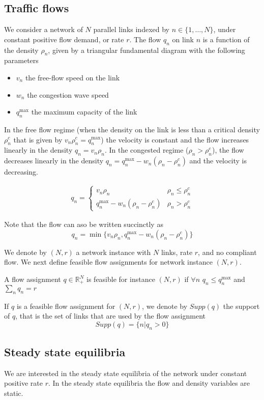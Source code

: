 \subsection{Traffic flows}
We consider a network of $N$ parallel links indexed by $n \in \{1, \dots, N \}$, under constant positive flow demand, or rate $r$. The flow $q_n$ on link $n$ is a function of the density $\rho_n$, given by a triangular fundamental diagram with the following parameters
\begin{itemize}
\item $v_n$ the free-flow speed on the link
\item $w_n$ the congestion wave speed
\item $q_n^{\max}$ the maximum capacity of the link
\end{itemize}
In the free flow regime (when the density on the link is less than a critical density $\rho_n^c$ that is given by $v_n\rho_n^c = q_n^{\max}$) the velocity is constant and the flow increases linearly in the density $q_n = v_n \rho_n$. In the congested regime ($\rho_n > \rho_n^c$), the flow decreases linearly in the density $q_n = q_n^{\max} - w_n(\rho_n - \rho_n^c)$ and the velocity is decreasing.

\begin{align*}
q_n = 
\begin{cases}
v_n \rho_n & \rho_n \leq \rho_n^c\\
q_n^{\max} - w_n(\rho_n - \rho_n^c) & \rho_n > \rho_n^c
\end{cases}
\end{align*}

Note that the flow can aso be written succinctly as
\[
q_n = \min \{ v_n \rho_n, q_n^{\max} - w_n(\rho_n - \rho_n^c)\}
\]

We denote by $(N, r)$ a network instance with $N$ links, rate $r$, and no compliant flow. We next define feasible flow assignments for network instance $(N, r)$.

\begin{definition}
A flow assignment $q \in \mathbb{R}_+^N$ is feasible for instance $(N, r)$ if $\forall n$ $q_n \leq q_n^{\max}$ and $\sum_n q_n = r$
\end{definition}

If $q$ is a feasible flow assignment for $(N, r)$, we denote by $Supp(q)$ the support of $q$, that is the set of links that are used by the flow assignment
\[
Supp(q) = \{ n | q_n >0 \}
\]

\subsection{Steady state equilibria}
We are interested in the steady state equilibria of the network under constant positive rate $r$. In the steady state equilibria the flow and density variables are static.

